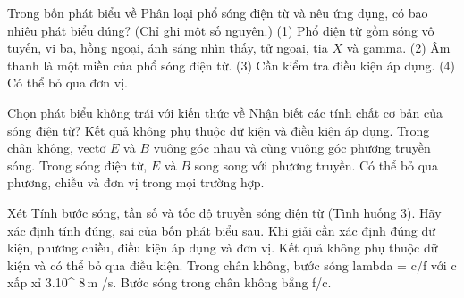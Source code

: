 \begin{ex}
Trong bốn phát biểu về Phân loại phổ sóng điện từ và nêu ứng dụng, có bao nhiêu phát biểu đúng? (Chỉ ghi một số nguyên.) (1) Phổ điện từ gồm sóng vô tuyến, vi ba, hồng ngoại, ánh sáng nhìn thấy, tử ngoại, tia $X$ và gamma. (2) Âm thanh là một miền của phổ sóng điện từ. (3) Cần kiểm tra điều kiện áp dụng. (4) Có thể bỏ qua đơn vị.
\end{ex}

\begin{ex}
Chọn phát biểu không trái với kiến thức về Nhận biết các tính chất cơ bản của sóng điện từ?
\choice
{Kết quả không phụ thuộc dữ kiện và điều kiện áp dụng.}
{\True Trong chân không, vectơ $E$ và $B$ vuông góc nhau và cùng vuông góc phương truyền sóng.}
{Trong sóng điện từ, $E$ và $B$ song song với phương truyền.}
{Có thể bỏ qua phương, chiều và đơn vị trong mọi trường hợp.}
\end{ex}

\begin{ex}
Xét Tính bước sóng, tần số và tốc độ truyền sóng điện từ (Tình huống 3). Hãy xác định tính đúng, sai của bốn phát biểu sau.
\choiceTF
{\True Khi giải cần xác định đúng dữ kiện, phương chiều, điều kiện áp dụng và đơn vị.}
{Kết quả không phụ thuộc dữ kiện và có thể bỏ qua điều kiện.}
{\True Trong chân không, bước sóng lambda = c/f với c xấp xỉ 3.10^ $8\,\text{m}$ /s.}
{Bước sóng trong chân không bằng f/c.}
\end{ex}

